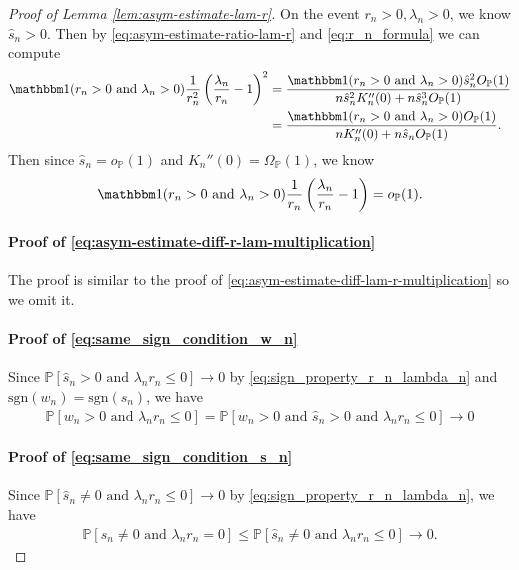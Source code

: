 \documentclass[12pt]{article}
\theoremstyle{definition}
\def\P{\mathbb{P}}
\def\P{\mathbb{P}}
\renewcommand{\P}{\mathbb{P}}							%
\newcommand{\indicator}{\mathbbm 1}						%
\begin{document}
\begin{proof}[Proof of Lemma \ref{lem:asym-estimate-lam-r}]
	On the event $r_n>0,\lambda_n>0$, we know $\hat s_n>0$. Then by \eqref{eq:asym-estimate-ratio-lam-r} and \eqref{eq:r_n_formula} we can compute 
	\begin{align*}
		\indicator(r_n>0\text{ and }\lambda_n>0)\frac{1}{r_n^2}\left(\frac{\lambda_n}{r_n}-1\right)^2
		&
		=\frac{\indicator(r_n>0\text{ and }\lambda_n>0)\hat s_n^2O_{\P}(1)}{n\hat s_n^2K_n''(0)+n\hat s_n^3O_{\P}(1)}\\
		&
		=\frac{\indicator(r_n>0\text{ and }\lambda_n>0)O_{\P}(1)}{nK_n''(0)+n\hat s_n O_{\P}(1)}.
	\end{align*}
	Then since $\hat s_n=o_{\P}(1)$ and $K_n''(0)=\Omega_{\P}(1)$, we know 
	\begin{align*}
		\indicator(r_n>0\text{ and }\lambda_n>0)\frac{1}{r_n}\left(\frac{\lambda_n}{r_n}-1\right)=o_{\P}(1).
	\end{align*} 

	\paragraph{Proof of \eqref{eq:asym-estimate-diff-r-lam-multiplication}}

	The proof is similar to the proof of \eqref{eq:asym-estimate-diff-lam-r-multiplication} so we omit it.

	\paragraph{Proof of \eqref{eq:same_sign_condition_w_n}}

	Since $\P[\hat s_n>0 \text{ and }\lambda_n r_n\leq 0]\rightarrow0$ by \eqref{eq:sign_property_r_n_lambda_n} and $\mathrm{sgn}(w_n)=\mathrm{sgn}(\hat s_n)$, we have 
	\begin{align*}
		\P[w_n>0 \text{ and }\lambda_n r_n\leq 0]=\P[w_n>0 \text{ and } \hat s_n>0 \text{ and }\lambda_n r_n\leq 0]\rightarrow0
	\end{align*}

	\paragraph{Proof of \eqref{eq:same_sign_condition_s_n}}

	Since $\P[\hat s_n\neq 0 \text{ and }\lambda_n r_n \leq  0]\rightarrow0$ by \eqref{eq:sign_property_r_n_lambda_n}, we have 
	\begin{align*}
		\P[\hat s_n\neq 0 \text{ and }\lambda_n r_n= 0]\leq \P[\hat s_n\neq 0 \text{ and } \lambda_n r_n\leq 0]\rightarrow0.
	\end{align*}

  \end{proof}
\end{document}
